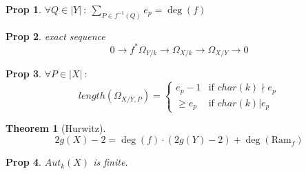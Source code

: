 \documentclass[a4paper, 12pt]{article}
\newtheorem*{prop}{Prop}
\newtheorem*{thm}{Theorem}
\begin{document}
	\begin{prop}
		$ \forall Q \in |Y| \: : \: \underset{P \in f^{-1}(Q)}{\sum} e_p = \deg(f) $
	\end{prop}
	
	\begin{prop}
		exact sequence \[ 0 \rightarrow f^*\Omega_{Y/k} \rightarrow \Omega_{X/k} \rightarrow \Omega_{X/Y} \rightarrow 0 \]
	\end{prop}
	
	\begin{prop}
		$ \forall P \in |X| \: : $
	\[ length(\Omega_{X/Y, P}) =	\begin{cases}
			e_p-1 & \text{if } char(k)\nmid e_p\\
			\ge e_p & \text{if } char(k) | e_p
		\end{cases}
	\]
	\end{prop}
		
	\begin{thm}[Hurwitz]
		\[ 2g(X)-2 = \deg (f) \cdot (2g(Y) -2) +\deg(\mathrm{Ram}_f)  \]
	\end{thm}
	
	\begin{prop}
		$ Aut_k(X) $ is finite.
	\end{prop}
	
	
\end{document}
